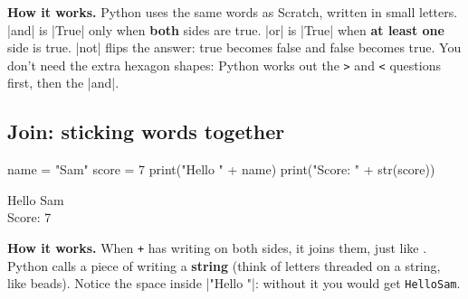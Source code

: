 \textbf{How it works.} Python uses the same words as Scratch, written in small letters. \py|and| is \py|True| only when \textbf{both} sides are true. \py|or| is \py|True| when \textbf{at least one} side is true. \py|not| flips the answer: true becomes false and false becomes true. You don't need the extra hexagon shapes: Python works out the \texttt{>} and \texttt{<} questions first, then the \py|and|.

\subsection*{Join: sticking words together}

\begin{tcbraster}[raster columns=2, raster equal height=rows, raster column skip=12pt, raster valign=center, raster force size=false, raster odd column/.style={add to width=-1.2cm}, raster even column/.style={add to width=1.2cm}]
\begin{tcolorbox}[colback=white, colframe=white, boxrule=0pt, valign=center]
\begin{scratch}
\end{scratch}
\end{tcolorbox}
\begin{tcolorbox}[colback=white, colframe=white, boxrule=0pt, left=0pt, right=0pt, top=0pt, bottom=0pt, valign=center]
\begin{code}
name = "Sam"
score = 7
print("Hello " + name)
print("Score: " + str(score))
\end{code}
\begin{outputbox}
Hello Sam\\
Score: 7
\end{outputbox}
\end{tcolorbox}
\end{tcbraster}

\textbf{How it works.} When \texttt{+} has writing on both sides, it joins them, just like . Python calls a piece of writing a \textbf{string} (think of letters threaded on a string, like beads). Notice the space inside \py|"Hello "|: without it you would get \texttt{HelloSam}.

